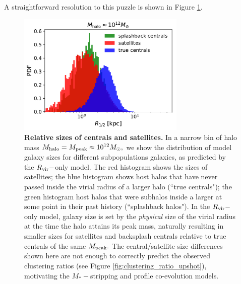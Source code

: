 \documentclass[usenatbib,usegraphicx,letterpaper]{mn2e}
\newcommand{\mstar}{M_{\ast}}
\newcommand{\mpeak}{M_{\rm peak}}
\newcommand{\mhalo}{M_{\rm halo}}
\newcommand{\rvir}{R_{\rm vir}}
\newcommand{\msun}{M_\odot}
\begin{document}
A straightforward resolution to this puzzle is shown in Figure \ref{fig:censatsizehist}. 

\begin{figure}
\centering
\includegraphics[width=8cm]{FIGS/cen_sat_sizes.pdf}
\caption{
{\bf Relative sizes of centrals and satellites.} In a narrow bin of halo mass $\mhalo=\mpeak\approx10^{12}\msun,$ we show the distribution of model galaxy sizes for different subpopulations galaxies, as predicted by the $\rvir-$only model. The red histogram shows the sizes of satellites; the blue histogram shows host halos that have never passed inside the virial radius of a larger halo (``true centrals"); the green histogram host halos that were subhalos inside a larger at some point in their past history (``splashback halos"). In the $\rvir-$only model, galaxy size is set by the {\em physical} size of the virial radius at the time the halo attains its peak mass, naturally resulting in smaller sizes for satellites and backsplash centrals relative to true centrals of the same $\mpeak.$ The central/satellite size differences shown here are not enough to correctly predict the observed clustering ratios (see Figure \ref{fig:clustering_ratio_upshot}), motivating the $\mstar-$stripping and profile co-evolution models. 
}
\label{fig:censatsizehist}
\end{figure}

\end{document}
